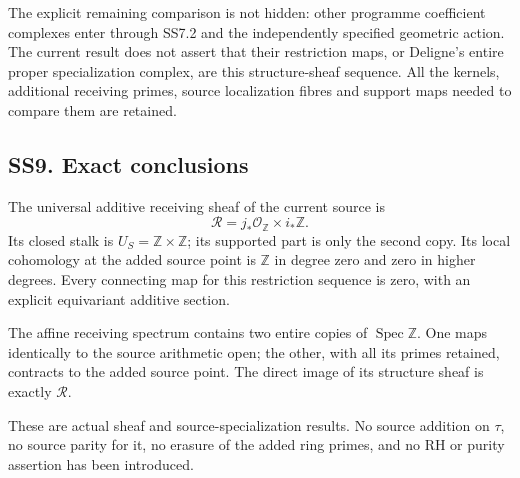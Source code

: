The explicit remaining comparison is not hidden: other programme
coefficient complexes enter through SS7.2 and the independently
specified geometric action. The current result does not assert that
their restriction maps, or Deligne's entire proper specialization
complex, are this structure-sheaf sequence. All the kernels, additional
receiving primes, source localization fibres and support maps needed to
compare them are retained.

\subsection{SS9. Exact conclusions}\label{ss9.-exact-conclusions}

The universal additive receiving sheaf of the current source is \[
 \mathcal R=j_*\mathcal O_{\mathbb Z}\times i_*\mathbb Z.
\] Its closed stalk is \(U_S=\mathbb Z\times\mathbb Z\); its supported
part is only the second copy. Its local cohomology at the added source
point is \(\mathbb Z\) in degree zero and zero in higher degrees. Every
connecting map for this restriction sequence is zero, with an explicit
equivariant additive section.

The affine receiving spectrum contains two entire copies of
\(\operatorname{Spec}\mathbb Z\). One maps identically to the source
arithmetic open; the other, with all its primes retained, contracts to
the added source point. The direct image of its structure sheaf is
exactly \(\mathcal R\).

These are actual sheaf and source-specialization results. No source
addition on \(\tau\), no source parity for it, no erasure of the added
ring primes, and no RH or purity assertion has been introduced.
